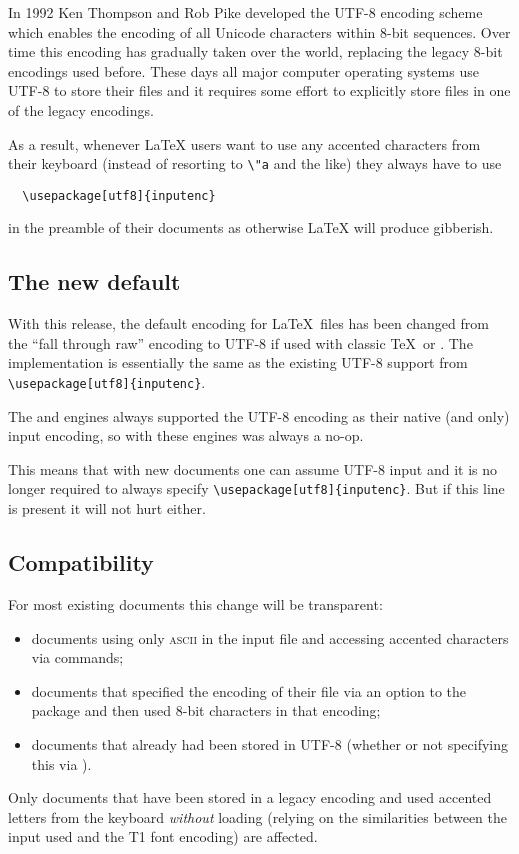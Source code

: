 \documentclass{ltnews}
\providecommand\acro[1]{\textsc{#1}}
\begin{document}
In 1992 Ken Thompson and Rob Pike developed the UTF-8 encoding scheme
which enables the encoding of all Unicode characters within 8-bit sequences.
Over time this encoding has gradually taken over the world,
replacing the legacy 8-bit encodings used before. These days all major
computer operating systems use UTF-8 to store their files and it
requires some effort to explicitly store files in one of the legacy
encodings.

As a result, whenever \LaTeX{} users want to use any accented
characters from their keyboard (instead of resorting to \verb=\"a= and
the like) they always have to use
\begin{verbatim}
  \usepackage[utf8]{inputenc}
\end{verbatim}
in the preamble of their documents as otherwise \LaTeX{} will produce
gibberish.

\subsection{The new default}

With this release, the default encoding for \LaTeX\ files has been
changed from the ``fall through raw'' encoding to UTF-8 if used with
classic \TeX\ or . The implementation is essentially
the same as the existing UTF-8 support from
\verb|\usepackage[utf8]{inputenc}|.

The  and  engines always supported the
UTF-8 encoding as their native (and only) input encoding, so with
these engines  was always a no-op.

This means that with new documents one can assume UTF-8 input and it
is no longer required to always specify
\verb|\usepackage[utf8]{inputenc}|. But if this line is present it
will not hurt either.


\subsection{Compatibility}

For most existing documents this change will be transparent:
\begin{itemize}
\item documents using only \acro{ascii} in the input file and
  accessing accented characters via commands;
\item documents that specified the encoding of their file via an
  option to the  package and then used 8-bit
  characters in that encoding;
\item documents that already had been stored in UTF-8 (whether or not
  specifying this via ).
\end{itemize}
Only documents that have been stored in a legacy encoding and used
accented letters from the keyboard \emph{without} loading
 (relying on the similarities between the input used
and the T1 font encoding) are affected.
\end{document}

